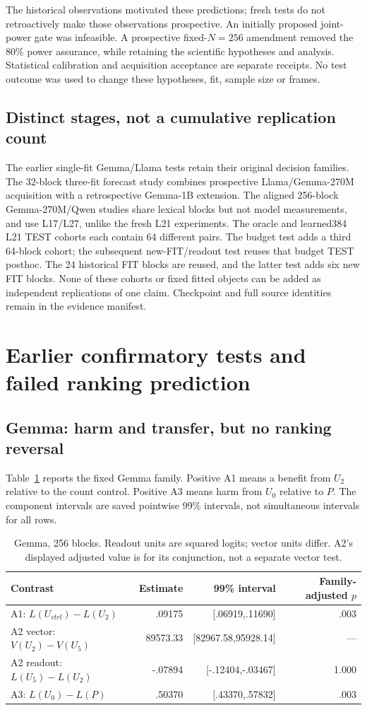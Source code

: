 The historical observations motivated these predictions; fresh tests do not retroactively make those observations prospective. An initially proposed joint-power gate was infeasible. A prospective fixed-$N=256$ amendment removed the 80\% power assurance, while retaining the scientific hypotheses and analysis. Statistical calibration and acquisition acceptance are separate receipts. No test outcome was used to change these hypotheses, fit, sample size or frames.

\subsection{Distinct stages, not a cumulative replication count}
The earlier single-fit Gemma/Llama tests retain their original decision families. The 32-block three-fit forecast study combines prospective Llama/Gemma-270M acquisition with a retrospective Gemma-1B extension. The aligned 256-block Gemma-270M/Qwen studies share lexical blocks but not model measurements, and use L17/L27, unlike the fresh L21 experiments. The oracle and learned384 L21 TEST cohorts each contain 64 different pairs. The budget test adds a third 64-block cohort; the subsequent new-FIT/readout test reuses that budget TEST posthoc. The 24 historical FIT blocks are reused, and the latter test adds six new FIT blocks. None of these cohorts or fixed fitted objects can be added as independent replications of one claim. Checkpoint and full source identities remain in the evidence manifest.

\section{Earlier confirmatory tests and failed ranking prediction}
\label{sec:earlier}

\subsection{Gemma: harm and transfer, but no ranking reversal}
Table~\ref{tab:gemma} reports the fixed Gemma family. Positive A1 means a benefit from $U_2$ relative to the count control. Positive A3 means harm from $U_0$ relative to $P$. The component intervals are saved pointwise 99\% intervals, not simultaneous intervals for all rows.
\begin{table}[ht]
\centering\small
\begin{tabular}{lrrr}
\toprule Contrast & Estimate & 99\% interval & Family-adjusted $p$\\
\midrule
A1: $L(U_{ctrl})-L(U_2)$ & .09175 & [.06919,.11690] & .003\\
A2 vector: $V(U_2)-V(U_5)$ & 89573.33 & [82967.58,95928.14] & ---\\
A2 readout: $L(U_5)-L(U_2)$ & -.07894 & [-.12404,-.03467] & 1.000\\
A3: $L(U_0)-L(P)$ & .50370 & [.43370,.57832] & .003\\
\bottomrule
\end{tabular}
\caption{Gemma, 256 blocks. Readout units are squared logits; vector units differ. A2's displayed adjusted value is for its conjunction, not a separate vector test.}\label{tab:gemma}
\end{table}

